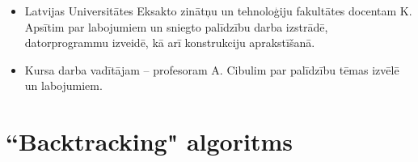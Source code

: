 \documentclass[utf8]{ludis2022}
\begin{document}

\newpage

\clearpage
{}
\printbibliography[title=Izmantotā literatūra un avoti] 


\newpage




\begin{itemize}
    \item Latvijas Universitātes Eksakto zinātņu un tehnoloģiju fakultātes docentam K. Apsītim par labojumiem un sniegto palīdzību darba izstrādē, datorprogrammu izveidē, kā arī konstrukciju aprakstīšanā.
    \item Kursa darba vadītājam -- profesoram A. Cibulim par palīdzību tēmas izvēlē un labojumiem.
\end{itemize}






\appendix
{}

\section{``Backtracking" algoritms}\label{app:kods1} %
\end{document}
